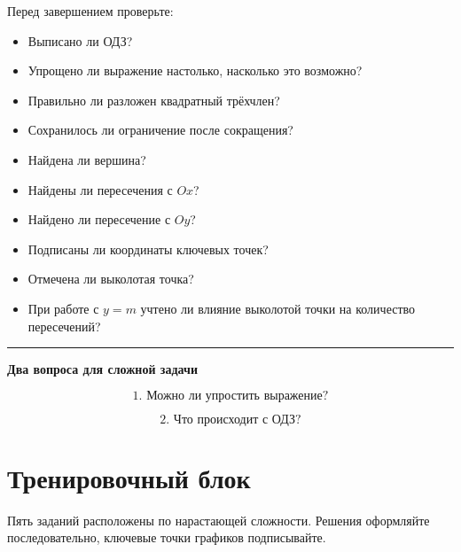 \documentclass[a4paper,12pt]{article}
\newcommand{\accentline}{%
  \par\noindent
  \textcolor{accent}{\rule{\linewidth}{0.55pt}}
  \par
}
\begin{document}
Перед завершением проверьте:

\begin{itemize}
  \item Выписано ли ОДЗ?
  \item Упрощено ли выражение настолько, насколько это возможно?
  \item Правильно ли разложен квадратный трёхчлен?
  \item Сохранилось ли ограничение после сокращения?
  \item Найдена ли вершина?
  \item Найдены ли пересечения с \(Ox\)?
  \item Найдено ли пересечение с \(Oy\)?
  \item Подписаны ли координаты ключевых точек?
  \item Отмечена ли выколотая точка?
  \item При работе с \(y=m\) учтено ли влияние выколотой точки
  на количество пересечений?
\end{itemize}

\accentline

\begin{center}
\textbf{\color{darkaccent}
Два вопроса для сложной задачи}
\end{center}

\[
\boxed{\text{1. Можно ли упростить выражение?}}
\]

\[
\boxed{\text{2. Что происходит с ОДЗ?}}
\]

\clearpage

\section*{Тренировочный блок}

\textcolor{softgray}{
Пять заданий расположены по нарастающей сложности.
Решения оформляйте последовательно, ключевые точки графиков подписывайте.
}

\vspace{4mm}
\end{document}
